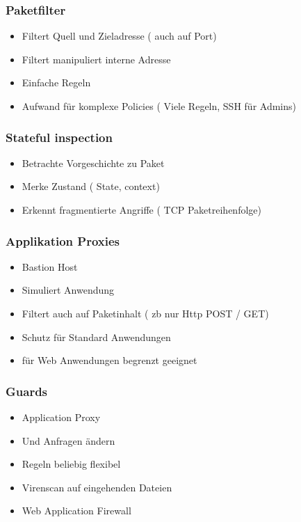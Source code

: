 {\subsubsection*{ Paketfilter }
\begin{itemize}
	\item Filtert Quell und Zieladresse ( auch auf Port)
	\item Filtert manipuliert interne Adresse
	\item Einfache Regeln
	\item Aufwand für komplexe Policies ( Viele Regeln, SSH für Admins)
\end{itemize}

\subsubsection*{ Stateful inspection }
\begin{itemize}
	\item Betrachte Vorgeschichte zu Paket
	\item Merke Zustand ( State, context)
	\item Erkennt fragmentierte Angriffe ( TCP Paketreihenfolge)
\end{itemize}

\subsubsection*{ Applikation Proxies }
\begin{itemize}
	\item Bastion Host
	\item Simuliert Anwendung
	\item Filtert auch auf Paketinhalt ( zb nur Http POST / GET)
	\item Schutz für Standard Anwendungen
	\item für Web Anwendungen begrenzt geeignet
\end{itemize}

\subsubsection*{ Guards }
\begin{itemize}
	\item Application Proxy
	\item Und Anfragen ändern
	\item Regeln beliebig flexibel
	\item Virenscan auf eingehenden Dateien
	\item Web Application Firewall
\end{itemize}

}
